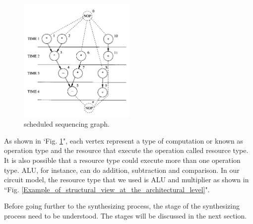 \begin{figure}[ht]
    \centering
    \includegraphics[width=0.5\textwidth]{scheduled_sequencing_graph}
    \caption{scheduled sequencing graph. \cite{main}}
    \label{scheduled_sequencing_graph}
\end{figure}

As shown in `Fig. \ref{scheduled_sequencing_graph}", each vertex represent a type of computation or known as operation type and the resource that execute the operation called resource type. It is also possible that a resource type could execute more than one operation type. ALU, for instance, can do addition, subtraction and comparison. In our circuit model, the resource type that we used is ALU and multiplier as shown in ``Fig. \ref{Example_of_structural_view_at_the_architectural_level}". 

Before going further to the synthesizing process, the stage of the synthesizing process need to be understood. The stages will be discussed in the next section.